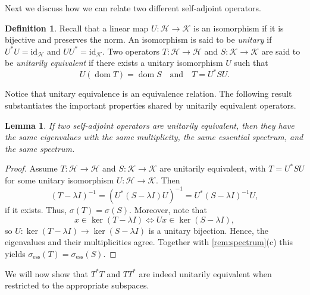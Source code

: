 \documentclass[11pt]{article}
\newtheorem{lemma}[theorem]{Lemma}
\theoremstyle{definition}
\newtheorem{definition}[theorem]{Definition}
\theoremstyle{remark}
\DeclareMathOperator\dom{dom}
\newcommand{\Hh}{\mathcal{H}}
\newcommand{\Kk}{\mathcal{K}}
\begin{document}
Next we discuss how we can relate two different self-adjoint operators.

\begin{definition}\citep[Unitary Equivalence,][p.~105]{teschl}
    Recall that a linear map $U:\mathcal{H}\to \mathcal{K}$ is an isomorphism if it is bijective and preserves the norm. An isomorphism is said to be \emph{unitary} if $U^*U=\text{id}_\mathcal{H}$ and $UU^*=\text{id}_\mathcal{K}$. Two operators $T:\mathcal{H}\to\mathcal{H}$ and $S:\mathcal{K}\to\mathcal{K}$ are said to be \emph{unitarily equivalent} if there exists a unitary isomorphism $U$ such that  
    $$U(\dom T)=\dom S\quad \text{and}\quad T=U^*SU.$$
\end{definition}
Notice that unitary equivalence is an equivalence relation.
The following result substantiates the important properties shared by unitarily equivalent operators.

\begin{lemma}\textnormal{\citep[see e.g.,][\S73]{akglazman}}\label{lem:allthesame}
    If two self-adjoint operators are unitarily equivalent, then they have the same eigenvalues with the same multiplicity, the same essential spectrum, and the same spectrum.
\end{lemma}

\begin{proof}
   Assume $T:\mathcal{H}\to\Hh$ and $S:\Kk\to\Kk$ are unitarily equivalent, with $T=U^*SU$ for some unitary isomorphism $U:\Hh\to\Kk$. Then
    $$(T-\lambda I)^{-1}=\left(U^*(S-\lambda I)U\right)^{-1}=U^*(S-\lambda I)^{-1}U,$$
    if it exists. Thus, $\sigma(T)=\sigma(S)$. Moreover, note that
    $$x\in\ker (T-\lambda I)\Leftrightarrow Ux\in \ker(S-\lambda I),$$ so $U:\ker (T-\lambda I)\to\ker (S-\lambda I)$ is a unitary bijection. Hence, the eigenvalues and their multiplicities agree. Together with \cref{rem:spectrum}(c) this yields $\sigma_{\text{ess}}(T)=\sigma_{\text{ess}}(S)$.
\end{proof}

We will now show that $T^*T$ and $TT^*$ are indeed unitarily equivalent when restricted to the appropriate subspaces.
\end{document}
